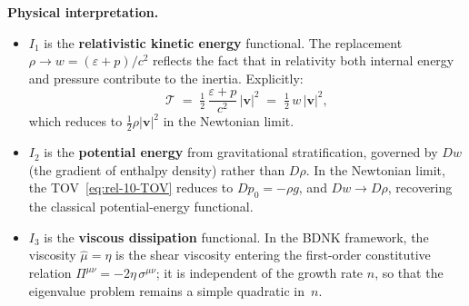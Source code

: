 \medskip\noindent\textbf{Physical interpretation.}
\begin{itemize}
\item $I_{1}$ is the \textbf{relativistic kinetic energy} functional.
  The replacement $\rho \to w = (\varepsilon + p)/c^{2}$ reflects the
  fact that in relativity both internal energy and pressure contribute
  to the inertia.  Explicitly:
  \begin{equation}\label{eq:rel-10-KE}
    \mathcal{T} \;=\; \tfrac{1}{2}\,
    \frac{\varepsilon + p}{c^{2}}\,|\boldsymbol{v}|^{2}
    \;=\; \tfrac{1}{2}\,w\,|\boldsymbol{v}|^{2},
  \end{equation}
  which reduces to $\tfrac{1}{2}\rho|\boldsymbol{v}|^{2}$ in the
  Newtonian limit.

\item $I_{2}$ is the \textbf{potential energy} from gravitational
  stratification, governed by $Dw$ (the gradient of enthalpy density)
  rather than $D\rho$.  In the Newtonian limit, the
  TOV~\eqref{eq:rel-10-TOV} reduces to $Dp_{0} = -\rho g$, and $Dw
  \to D\rho$, recovering the classical potential-energy functional.

\item $I_{3}$ is the \textbf{viscous dissipation} functional.  In the
  BDNK framework, the viscosity $\hat{\mu} = \eta$ is the shear
  viscosity entering the first-order constitutive relation
  $\Pi^{\mu\nu} = -2\eta\,\sigma^{\mu\nu}$; it is independent of
  the growth rate $n$, so that the eigenvalue problem remains a
  simple quadratic in~$n$.
\end{itemize}

